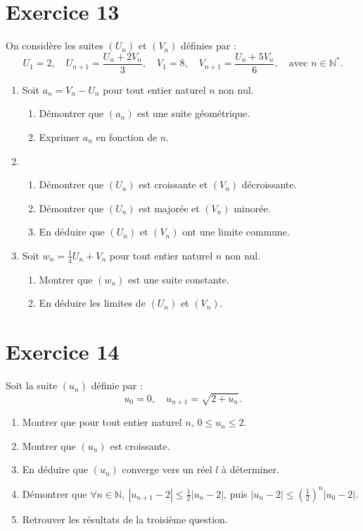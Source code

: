 \documentclass[12pt]{article}
\begin{document}
\section*{Exercice 13}

On considère les suites \((U_n)\) et \((V_n)\) définies par :
\[
U_1 = 2, \quad U_{n+1} = \frac{U_n + 2V_n}{3}, \quad
V_1 = 8, \quad V_{n+1} = \frac{U_n + 5V_n}{6}, \quad \text{avec } n \in \mathbb{N}^*.
\]

\begin{enumerate}
    \item Soit \(a_n = V_n - U_n\) pour tout entier naturel \(n\) non nul.
    \begin{enumerate}
        \item Démontrer que \((a_n)\) est une suite géométrique.
        \item Exprimer \(a_n\) en fonction de \(n\).
    \end{enumerate}

    \item 
    \begin{enumerate}
        \item Démontrer que \((U_n)\) est croissante et \((V_n)\) décroissante.
        \item Démontrer que \((U_n)\) est majorée et \((V_n)\) minorée.
        \item En déduire que \((U_n)\) et \((V_n)\) ont une limite commune.
    \end{enumerate}

    \item Soit \(w_n = \frac{1}{4}U_n + V_n\) pour tout entier naturel \(n\) non nul.
    \begin{enumerate}
        \item Montrer que \((w_n)\) est une suite constante.
        \item En déduire les limites de \((U_n)\) et \((V_n)\).
    \end{enumerate}
\end{enumerate}

\section*{Exercice 14}

Soit la suite \((u_n)\) définie par :
\[
u_0 = 0, \quad u_{n+1} = \sqrt{2 + u_n}.
\]

\begin{enumerate}
    \item Montrer que pour tout entier naturel \(n\), \(0 \leq u_n \leq 2\).
    \item Montrer que \((u_n)\) est croissante.
    \item En déduire que \((u_n)\) converge vers un réel \(l\) à déterminer.
    \item Démontrer que \(\forall n \in \mathbb{N}, \ |u_{n+1} - 2| \leq \frac{1}{2} |u_n - 2|\), puis \(|u_n - 2| \leq \left(\frac{1}{2}\right)^n |u_0 - 2|\).
    \item Retrouver les résultats de la troisième question.
\end{enumerate}
\end{document}
